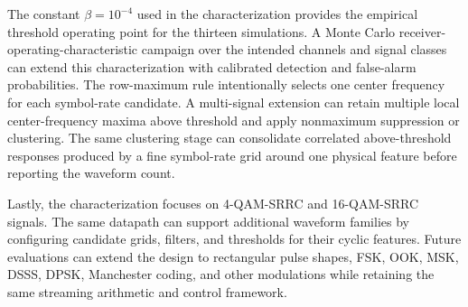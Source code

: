 The constant $\beta=10^{-4}$ used in the characterization provides the empirical threshold operating point for the thirteen simulations.  A Monte Carlo receiver-operating-characteristic campaign over the intended channels and signal classes can extend this characterization with calibrated detection and false-alarm probabilities.  The row-maximum rule intentionally selects one center frequency for each symbol-rate candidate.  A multi-signal extension can retain multiple local center-frequency maxima above threshold and apply nonmaximum suppression or clustering.  The same clustering stage can consolidate correlated above-threshold responses produced by a fine symbol-rate grid around one physical feature before reporting the waveform count.

Lastly, the characterization focuses on 4-QAM-SRRC and 16-QAM-SRRC signals.  The same datapath can support additional waveform families by configuring candidate grids, filters, and thresholds for their cyclic features.  Future evaluations can extend the design to rectangular pulse shapes, FSK, OOK, MSK, DSSS, DPSK, Manchester coding, and other modulations while retaining the same streaming arithmetic and control framework.

\clearpage

